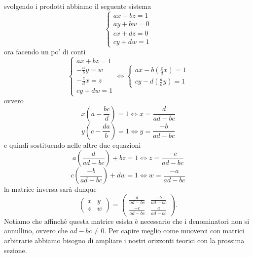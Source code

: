 \documentclass[11pt]{scrartcl}
\begin{document}
 	svolgendo i prodotti abbiamo il seguente sistema
 	$$
 	\begin{cases}
 		ax+bz=1 \\
 		ay+bw=0 \\
 		cx+dz=0 \\
 		cy+dw=1 
 	\end{cases}
 	$$
 	ora facendo un po' di conti
 	$$
 	\begin{cases}
 		ax+bz=1 \\
 		-\frac{a}{b}y=w \\
 		-\frac{c}{d}x=z \\
 		cy+dw=1
 	\end{cases}
 	\iff 
 	\begin{cases}
 		ax-b\left(\frac{c}{d}x\right)=1 \\
 		cy-d\left(\frac{a}{b}y\right)=1
 	\end{cases}
 	$$
 	ovvero
 	$$x\left(a-\frac{bc}{d}\right)=1 \iff x= \frac{d}{ad-bc}$$
 	$$y\left(c-\frac{da}{b}\right)=1 \iff y =\frac{-b}{ad-bc}$$
 	e quindi sostituendo nelle altre due equazioni
 	$$a\left(\frac{d}{ad-bc}\right)+bz=1 \iff z=\frac{-c}{ad-bc}$$
 	$$c\left(\frac{-b}{ad-bc}\right)+dw=1 \iff w=\frac{-a}{ad-bc}$$
 	la matrice inversa sarà dunque
 	$$
 	\begin{pmatrix}
 		x & y \\
 		z & w
 	\end{pmatrix}
 	=
 	\begin{pmatrix}
 		\frac{d}{ad-bc} & \frac{-b}{ad-bc} \\
 		\frac{-c}{ad-bc} & \frac{a}{ad-bc}
 	\end{pmatrix}.
 	$$
 	Notiamo che affinchè questa matrice esista è necessario che i denominatori non si annullino, ovvero che $ad-bc\ne 0$. Per capire meglio come muoverci con matrici arbitrarie abbiamo bisogno di ampliare i nostri orizzonti teorici con la prossima sezione.
 	
 	\newpage
 	
\end{document}
